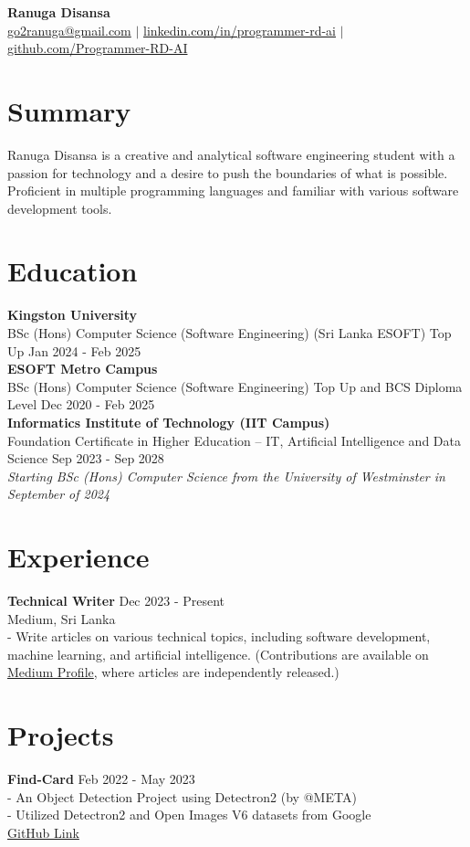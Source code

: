 \documentclass[10pt,letterpaper]{article}
\begin{document}
\noindent
{\LARGE \textbf{Ranuga Disansa}} \\
\href{mailto:go2ranuga@gmail.com}{go2ranuga@gmail.com} $\vert$ \href{https://www.linkedin.com/in/programmer-rd-ai/}{linkedin.com/in/programmer-rd-ai} $\vert$ \href{https://github.com/Programmer-RD-AI}{github.com/Programmer-RD-AI}

\section*{Summary}
Ranuga Disansa is a creative and analytical software engineering student with a passion for technology and a desire to push the boundaries of what is possible. Proficient in multiple programming languages and familiar with various software development tools.

\section*{Education}
\textbf{Kingston University} \\
BSc (Hons) Computer Science (Software Engineering) (Sri Lanka ESOFT) Top Up \hfill Jan 2024 - Feb 2025 \\
\textbf{ESOFT Metro Campus} \\
BSc (Hons) Computer Science (Software Engineering) Top Up and BCS Diploma Level \hfill Dec 2020 - Feb 2025 \\
\textbf{Informatics Institute of Technology (IIT Campus)} \\
Foundation Certificate in Higher Education – IT, Artificial Intelligence and Data Science \hfill Sep 2023 - Sep 2028 \\
\textit{Starting BSc (Hons) Computer Science from the University of Westminster in September of 2024}

\section*{Experience}
\textbf{Technical Writer} \hfill Dec 2023 - Present \\
Medium, Sri Lanka \\
- Write articles on various technical topics, including software development, machine learning, and artificial intelligence. (Contributions are available on \href{https://medium.com/@Programmer-RD-AI}{Medium Profile}, where articles are independently released.)

\section*{Projects}
\textbf{Find-Card} \hfill Feb 2022 - May 2023 \\
- An Object Detection Project using Detectron2 (by @META) \\
- Utilized Detectron2 and Open Images V6 datasets from Google \\
\href{https://github.com/Programmer-RD-AI/Find-Card}{GitHub Link}
\end{document}
